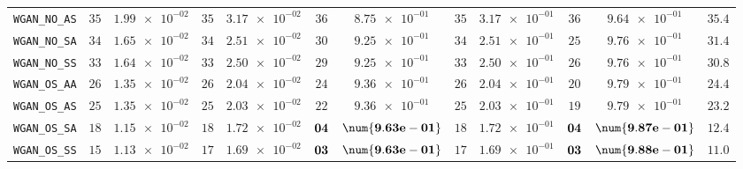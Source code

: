 \begin{xltabular}{\textwidth}{l||cC|cC|cC|cC|cC||c}
	\texttt{WGAN\_NO\_AS} & $ 35$ & $ \num{1.99e-02}$ & $ 35$ & $ \num{3.17e-02}$ & $ 36$ & $ \num{8.75e-01}$ & $ 35$ & $ \num{3.17e-01}$ & $ 36$ & $ \num{9.64e-01}$ & $ 35.4$  \\
	\texttt{WGAN\_NO\_SA} & $ 34$ & $ \num{1.65e-02}$ & $ 34$ & $ \num{2.51e-02}$ & $ 30$ & $ \num{9.25e-01}$ & $ 34$ & $ \num{2.51e-01}$ & $ 25$ & $ \num{9.76e-01}$ & $ 31.4$  \\
	\texttt{WGAN\_NO\_SS} & $ 33$ & $ \num{1.64e-02}$ & $ 33$ & $ \num{2.50e-02}$ & $ 29$ & $ \num{9.25e-01}$ & $ 33$ & $ \num{2.50e-01}$ & $ 26$ & $ \num{9.76e-01}$ & $ 30.8$  \\
	\texttt{WGAN\_OS\_AA} & $ 26$ & $ \num{1.35e-02}$ & $ 26$ & $ \num{2.04e-02}$ & $ 24$ & $ \num{9.36e-01}$ & $ 26$ & $ \num{2.04e-01}$ & $ 20$ & $ \num{9.79e-01}$ & $ 24.4$  \\
	\texttt{WGAN\_OS\_AS} & $ 25$ & $ \num{1.35e-02}$ & $ 25$ & $ \num{2.03e-02}$ & $ 22$ & $ \num{9.36e-01}$ & $ 25$ & $ \num{2.03e-01}$ & $ 19$ & $ \num{9.79e-01}$ & $ 23.2$  \\
	\texttt{WGAN\_OS\_SA} & $ 18$ & $ \num{1.15e-02}$ & $ 18$ & $ \num{1.72e-02}$ & $\bf 04$ & $\bf \num{9.63e-01}$ & $ 18$ & $ \num{1.72e-01}$ & $\bf 04$ & $\bf \num{9.87e-01}$ & $ 12.4$  \\
	\texttt{WGAN\_OS\_SS} & $ 15$ & $ \num{1.13e-02}$ & $ 17$ & $ \num{1.69e-02}$ & $\bf 03$ & $\bf \num{9.63e-01}$ & $ 17$ & $ \num{1.69e-01}$ & $\bf 03$ & $\bf \num{9.88e-01}$ & $ 11.0$  \\

\end{xltabular}
